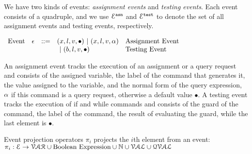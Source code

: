 %
%
We have two kinds of events: \emph{assignment events} and \emph{testing events}. 
Each event consists of a quadruple,
and we use $\mathcal{E}^{\mathtt{{asn}}}$ and $\mathcal{E}^{\mathtt{{test}}}$ to denote the set of all assignment events and testing events, respectively.
\begin{center}
$ \begin{array}{lllll}
\mbox{Event} 
& \mathtt{\epsilon} & ::= & 
({x}, l, v, \bullet) ~|~ ({x}, l, v, \alpha)  & \mbox{Assignment Event} \\
&&& ~|~(b, l, v, \bullet)  & \mbox{Testing Event}
\\
\end{array}$
\end{center}
An assignment event tracks the execution of an assignment  or a query request and consists of the assigned variable, the label of the command that generates it, the value assigned to the variable, and the normal form of the query expression, $\alpha$ if this command is a query request, otherwise a default value $\bullet$.
A testing event tracks the execution of if and while commands and consists of the guard of the command, the label of the command, the result of evaluating the guard, while the last element is $\bullet$.
%

Event projection operators $\pi_i$ projects the $i$th element from an event: 
\\
$\pi_i : 
\mathcal{E} \to \mathcal{VAR}\cup \mbox{Boolean Expression}  \cup \mathbb{N} \cup \mathcal{VAL} \cup \mathcal{QVAL} $ 

